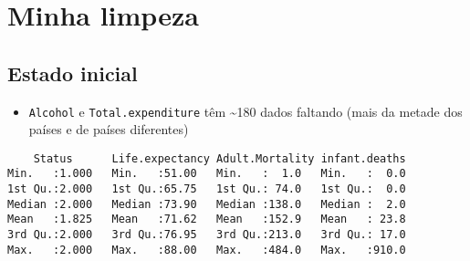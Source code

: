 \documentclass[11pt]{article}
\date{\today}
\title{}
\begin{document}
\tableofcontents
\clearpage
\section{Minha limpeza}
\label{sec:org97358d7}
\subsection{Estado inicial}
\label{sec:orgf56efb0}
\begin{itemize}
\item \texttt{Alcohol} e \texttt{Total.expenditure} têm \textasciitilde{}180 dados faltando (mais da metade dos países e de países diferentes)
\end{itemize}
\begin{verbatim}
    Status      Life.expectancy Adult.Mortality infant.deaths  
Min.   :1.000   Min.   :51.00   Min.   :  1.0   Min.   :  0.0  
1st Qu.:2.000   1st Qu.:65.75   1st Qu.: 74.0   1st Qu.:  0.0  
Median :2.000   Median :73.90   Median :138.0   Median :  2.0  
Mean   :1.825   Mean   :71.62   Mean   :152.9   Mean   : 23.8  
3rd Qu.:2.000   3rd Qu.:76.95   3rd Qu.:213.0   3rd Qu.: 17.0  
Max.   :2.000   Max.   :88.00   Max.   :484.0   Max.   :910.0  


\end{verbatim}
\end{document}
